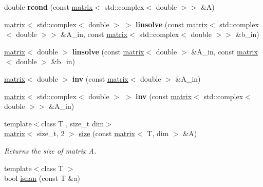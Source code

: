 \begin{DoxyCompactItemize}
\item 
\hypertarget{namespacekeycpp_a4d9a9dd04453e5a417f7a9eb8ae4391b}{double {\bfseries rcond} (const \hyperlink{classkeycpp_1_1matrix}{matrix}$<$ std\-::complex$<$ double $>$$>$ \&A)}\label{namespacekeycpp_a4d9a9dd04453e5a417f7a9eb8ae4391b}

\item 
\hypertarget{namespacekeycpp_a689c189f68e2b22b98c1f484c4d965e8}{\hyperlink{classkeycpp_1_1matrix}{matrix}$<$ std\-::complex$<$ double $>$ $>$ {\bfseries linsolve} (const \hyperlink{classkeycpp_1_1matrix}{matrix}$<$ std\-::complex$<$ double $>$$>$ \&A\-\_\-in, const \hyperlink{classkeycpp_1_1matrix}{matrix}$<$ std\-::complex$<$ double $>$$>$ \&b\-\_\-in)}\label{namespacekeycpp_a689c189f68e2b22b98c1f484c4d965e8}

\item 
\hypertarget{namespacekeycpp_a3246a259240624138144230f049e8dde}{\hyperlink{classkeycpp_1_1matrix}{matrix}$<$ double $>$ {\bfseries linsolve} (const \hyperlink{classkeycpp_1_1matrix}{matrix}$<$ double $>$ \&A\-\_\-in, const \hyperlink{classkeycpp_1_1matrix}{matrix}$<$ double $>$ \&b\-\_\-in)}\label{namespacekeycpp_a3246a259240624138144230f049e8dde}

\item 
\hypertarget{namespacekeycpp_adc96927cda2df7a6e8e2031941c43601}{\hyperlink{classkeycpp_1_1matrix}{matrix}$<$ double $>$ {\bfseries inv} (const \hyperlink{classkeycpp_1_1matrix}{matrix}$<$ double $>$ \&A\-\_\-in)}\label{namespacekeycpp_adc96927cda2df7a6e8e2031941c43601}

\item 
\hypertarget{namespacekeycpp_a9085342fc708fd5babae39321da3b89a}{\hyperlink{classkeycpp_1_1matrix}{matrix}$<$ std\-::complex$<$ double $>$ $>$ {\bfseries inv} (const \hyperlink{classkeycpp_1_1matrix}{matrix}$<$ std\-::complex$<$ double $>$$>$ \&A\-\_\-in)}\label{namespacekeycpp_a9085342fc708fd5babae39321da3b89a}

\item 
{\footnotesize template$<$class T , size\-\_\-t dim$>$ }\\\hyperlink{classkeycpp_1_1matrix}{matrix}$<$ size\-\_\-t, 2 $>$ \hyperlink{namespacekeycpp_a3bffa5a846e181974d7bfe2ab41fe03a}{size} (const \hyperlink{classkeycpp_1_1matrix}{matrix}$<$ T, dim $>$ \&A)
\begin{DoxyCompactList}\small\item\em Returns the size of matrix A. \end{DoxyCompactList}\item 
\hypertarget{namespacekeycpp_ad91dbdf14632d313a304d3ddbadf935f}{{\footnotesize template$<$class T $>$ }\\bool \hyperlink{namespacekeycpp_ad91dbdf14632d313a304d3ddbadf935f}{isnan} (const T \&a)}\label{namespacekeycpp_ad91dbdf14632d313a304d3ddbadf935f}


\end{DoxyCompactItemize}
